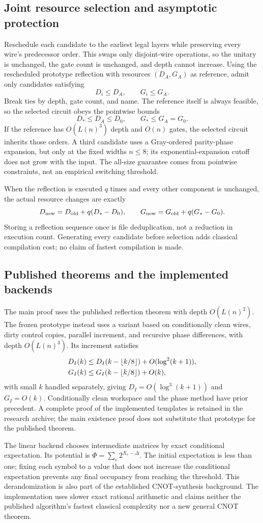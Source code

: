 \subsection{Joint resource selection and asymptotic protection}
Reschedule each candidate to the earliest legal layers while preserving every wire's predecessor order. This swaps only disjoint-wire operations, so the unitary is unchanged, the gate count is unchanged, and depth cannot increase. Using the rescheduled prototype reflection with resources $(D_A,G_A)$ as reference, admit only candidates satisfying
\[
D_i\le D_A,\qquad G_i\le G_A.
\]
Break ties by depth, gate count, and name. The reference itself is always feasible, so the selected circuit obeys the pointwise bounds
\[
D_*\le D_A\le D_0,\qquad G_*\le G_A=G_0.
\]
If the reference has $O(L(n)^3)$ depth and $O(n)$ gates, the selected circuit inherits those orders. A third candidate uses a Gray-ordered parity-phase expansion, but only at the fixed widths $n\le8$; its exponential-expansion cutoff does not grow with the input. The all-size guarantee comes from pointwise constraints, not an empirical switching threshold.

When the reflection is executed $q$ times and every other component is unchanged, the actual resource changes are exactly
\[
D_{\rm new}=D_{\rm old}+q(D_*-D_0),\qquad
G_{\rm new}=G_{\rm old}+q(G_*-G_0).
\]
Storing a reflection sequence once is file deduplication, not a reduction in execution count. Generating every candidate before selection adds classical compilation cost; no claim of fastest compilation is made.

\subsection{Published theorems and the implemented backends}
The main proof uses the published reflection theorem with depth $O(L(n)^2)$. The frozen prototype instead uses a variant based on conditionally clean wires, dirty control copies, parallel increment, and recursive phase differences, with depth $O(L(n)^3)$. Its increment satisfies
\[
\begin{aligned}
D_I(k)&\le D_I(k-\left\lfloor k/8\right\rfloor)+O(\log^2(k+1)),\\
G_I(k)&\le G_I(k-\left\lfloor k/8\right\rfloor)+O(k),
\end{aligned}
\]
with small $k$ handled separately, giving $D_I=O(\log^3(k+1))$ and $G_I=O(k)$. Conditionally clean workspace and the phase method have prior precedent\cite{nie2024}. A complete proof of the implemented templates is retained in the research archive; the main existence proof does not substitute that prototype for the published theorem.

The linear backend chooses intermediate matrices by exact conditional expectation. Its potential is $\Phi=\sum_e2^{X_e-\Delta}$. The initial expectation is less than one; fixing each symbol to a value that does not increase the conditional expectation prevents any final occupancy from reaching the threshold. This derandomization is also part of the established CNOT-synthesis background\cite{jiang2020}. The implementation uses slower exact rational arithmetic and claims neither the published algorithm's fastest classical complexity nor a new general CNOT theorem.
